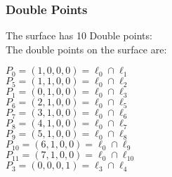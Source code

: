 \documentclass{article}
\begin{document}
{\subsubsection*{Double Points}
The surface has 10 Double points:\\
The double points on the surface are:\\
\begin{multicols}{2}
\noindent
$P_{0} = ( 1, 0, 0, 0 ) = \ell_{0} \cap \ell_{1} $\\
$P_{5} = ( 1, 1, 0, 0 ) = \ell_{0} \cap \ell_{2} $\\
$P_{1} = ( 0, 1, 0, 0 ) = \ell_{0} \cap \ell_{3} $\\
$P_{6} = ( 2, 1, 0, 0 ) = \ell_{0} \cap \ell_{5} $\\
$P_{7} = ( 3, 1, 0, 0 ) = \ell_{0} \cap \ell_{6} $\\
$P_{8} = ( 4, 1, 0, 0 ) = \ell_{0} \cap \ell_{7} $\\
$P_{9} = ( 5, 1, 0, 0 ) = \ell_{0} \cap \ell_{8} $\\
$P_{10} = ( 6, 1, 0, 0 ) = \ell_{0} \cap \ell_{9} $\\
$P_{11} = ( 7, 1, 0, 0 ) = \ell_{0} \cap \ell_{10} $\\
$P_{3} = ( 0, 0, 0, 1 ) = \ell_{3} \cap \ell_{4} $\\
\end{multicols}
}
\end{document}
